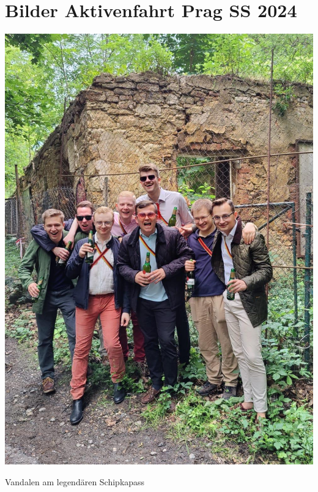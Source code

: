 \section{Bilder Aktivenfahrt Prag SS 2024}

	
\begin{center}
\begin{figurehere}
  \includegraphics[width=.7\linewidth]{./Bilder/1.5BackToTheRootsAktivenfahrtPrag/1.bild.jpeg} 
        \caption{Vandalen am legendären Schipkapass}
\end{figurehere}
\end{center}	
	

